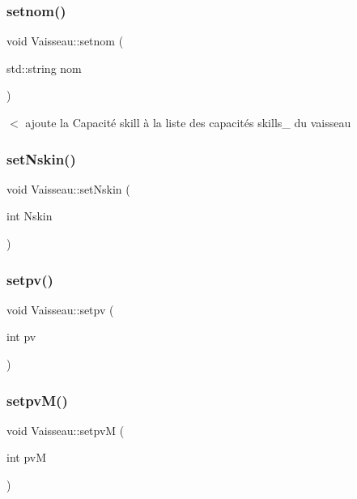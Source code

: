 \mbox{\label{class_vaisseau_a46174e710a959996ac9ae56f11757e61}} 
\subsubsection{\texorpdfstring{setnom()}{setnom()}}
{\footnotesize\ttfamily void Vaisseau\+::setnom (\begin{DoxyParamCaption}\item[{std\+::string}]{nom }\end{DoxyParamCaption})}



$<$ ajoute la {\ttfamily Capacité} skill à la liste des capacités skills\+\_\+ du vaisseau 

\mbox{\label{class_vaisseau_a0d57458dc32dde2d8326c20f25172bab}} 
\subsubsection{\texorpdfstring{set\+Nskin()}{setNskin()}}
{\footnotesize\ttfamily void Vaisseau\+::set\+Nskin (\begin{DoxyParamCaption}\item[{int}]{Nskin }\end{DoxyParamCaption})}

\mbox{\label{class_vaisseau_a2c9cf0b0520a6bee6408af58e3c99e34}} 
\subsubsection{\texorpdfstring{setpv()}{setpv()}}
{\footnotesize\ttfamily void Vaisseau\+::setpv (\begin{DoxyParamCaption}\item[{int}]{pv }\end{DoxyParamCaption})}

\mbox{\label{class_vaisseau_a10a33c8fed1bb1530148e98313d80a87}} 
\subsubsection{\texorpdfstring{setpv\+M()}{setpvM()}}
{\footnotesize\ttfamily void Vaisseau\+::setpvM (\begin{DoxyParamCaption}\item[{int}]{pvM }\end{DoxyParamCaption})}

